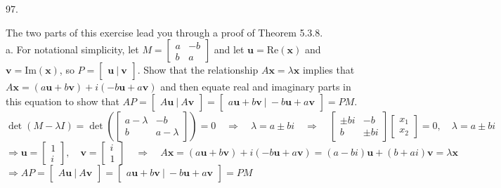 \documentclass[12pt]{book}
\begin{document}
\begin{CJK}{UTF8}{bsmi}
97. \begin{minipage}[t]{\dimexpr\linewidth-2em}
The two parts of this exercise lead you through a proof of Theorem 5.3.8. \\
a. For notational simplicity, let $M=\begin{bmatrix}
a & -b \\
b & a
\end{bmatrix}$ and let $\textbf{u}=\mathrm{Re}(\textbf{x})$ and $\textbf{v}=\mathrm{Im}(\textbf{x})$, so $P=\begin{bmatrix}
\textbf{u}\ |\ \textbf{v}
\end{bmatrix}$. Show that the relationship $A\textbf{x}=\lambda\textbf{x}$ implies that $A\textbf{x}=(a\textbf{u}+b\textbf{v})+i(-b\textbf{u}+a\textbf{v})$ and then equate real and imaginary parts in this equation to show that $AP=\begin{bmatrix}
A\textbf{u}\ |\ A\textbf{v}
\end{bmatrix}=\begin{bmatrix}
a\textbf{u}+b\textbf{v}\ |\ -b\textbf{u}+a\textbf{v}
\end{bmatrix}=PM$.\\
$\det(M-\lambda I)=\det(\begin{bmatrix}
a-\lambda & -b \\
b & a-\lambda
\end{bmatrix})=0\quad\Rightarrow\quad\lambda=a\pm bi\quad\Rightarrow\quad\begin{bmatrix}
\pm bi & -b \\
b & \pm bi
\end{bmatrix}\begin{bmatrix}
x_1 \\ x_2
\end{bmatrix}=0,\quad\lambda=a\pm bi$ \\
$\Rightarrow\textbf{u}=\begin{bmatrix}
1 \\ i
\end{bmatrix},\quad\textbf{v}=\begin{bmatrix}
i \\ 1
\end{bmatrix}\quad\Rightarrow\quad A\textbf{x}=(a\textbf{u}+b\textbf{v})+i(-b\textbf{u}+a\textbf{v})=(a-bi)\textbf{u}+(b+ai)\textbf{v}=\lambda\textbf{x}$\\
$\Rightarrow AP=\begin{bmatrix}
A\textbf{u}\ |\ A\textbf{v}
\end{bmatrix}=\begin{bmatrix}
a\textbf{u}+b\textbf{v}\ |\ -b\textbf{u}+a\textbf{v}
\end{bmatrix}=PM$ \\


\end{minipage}
\end{CJK}
\end{document}
